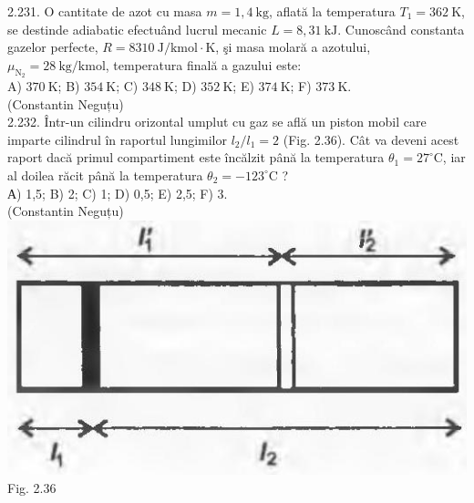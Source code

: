 \documentclass[10pt]{article}
\begin{document}
2.231. O cantitate de azot cu masa $m=1,4 \mathrm{~kg}$, aflată la temperatura $T_{1}=362 \mathrm{~K}$, se destinde adiabatic efectuând lucrul mecanic $L=8,31 \mathrm{~kJ}$. Cunoscând constanta gazelor perfecte, $R=8310 \mathrm{~J} / \mathrm{kmol} \cdot \mathrm{K}$, şi masa molară a azotului, $\mu_{\mathrm{N}_{2}}=28 \mathrm{~kg} / \mathrm{kmol}$, temperatura finală a gazului este:\\ A) $370 \mathrm{~K}$; B) $354 \mathrm{~K}$; C) $348 \mathrm{~K}$; D) $352 \mathrm{~K}$; E) $374 \mathrm{~K}$; F) $373 \mathrm{~K}$.\\ (Constantin Neguțu)\\

2.232. Într-un cilindru orizontal umplut cu gaz se află un piston mobil care imparte cilindrul în raportul lungimilor $l_{2} / l_{1}=2$ (Fig. 2.36). Cât va deveni acest raport dacă primul compartiment este încălzit până la temperatura $\theta_{1}=27^{\circ} \mathrm{C}$, iar al doilea răcit până la temperatura $\theta_{2}=-123^{\circ} \mathrm{C}$ ?\\ А) 1,5; B) 2; C) 1; D) 0,5; E) 2,5; F) 3.\\ (Constantin Neguțu)\\ \includegraphics[max width=\textwidth, center]{2025_07_01_5b3ff9fa0d508c8e9f17g-126(1)} Fig. 2.36\\
\end{document}
